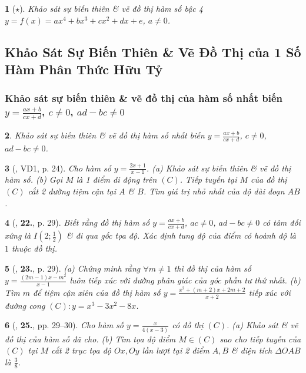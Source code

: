 \documentclass{article}
\newtheorem{baitoan}{}
\begin{document}
\begin{baitoan}[$\star$]
	Khảo sát sự biến thiên \& vẽ đồ thị hàm số bậc 4 $y = f(x) = ax^4 + bx^3 + cx^2 + dx + e$, $a\ne 0$.
\end{baitoan}


\subsection{Khảo Sát Sự Biến Thiên \& Vẽ Đồ Thị của 1 Số Hàm Phân Thức Hữu Tỷ}

\subsubsection{Khảo sát sự biến thiên \& vẽ đồ thị của hàm số nhất biến $y = \frac{ax + b}{cx + d}$, $c\ne 0$, $ad - bc\ne 0$}

\begin{baitoan}
	Khảo sát sự biến thiên \& vẽ đồ thị hàm số nhất biến $y = \frac{ax + b}{cx + d}$, $c\ne 0$, $ad - bc\ne 0$.
\end{baitoan}

\begin{baitoan}[\cite{TLCT_giai_tich_12}, VD1, p. 24]
	Cho hàm số $y = \frac{2x + 1}{x - 1}$. (a) Khảo sát sự biến thiên \& vẽ đồ thị hàm số. (b) Gọi $M$ là 1 điểm di động trên $(C)$. Tiếp tuyến tại $M$ của đồ thị $(C)$ cắt 2 đường tiệm cận tại $A$ \& $B$. Tìm giá trị nhỏ nhất của độ dài đoạn $AB$.
\end{baitoan}

\begin{baitoan}[\cite{TLCT_giai_tich_12}, \textbf{22.}, p. 29]
	Biết rằng đồ thị hàm số $y = \frac{ax + b}{cx + d}$, $ac\ne 0$, $ad - bc\ne 0$ có tâm đối xứng là $I\left(2;\frac{1}{2}\right)$ \& đi qua gốc tọa độ. Xác định tung độ của điểm có hoành độ là $1$ thuộc đồ thị.
\end{baitoan}

\begin{baitoan}[\cite{TLCT_giai_tich_12}, \textbf{23.}, p. 29]
	(a) Chứng minh rằng $\forall m\ne 1$ thì đồ thị của hàm số $y = \frac{(2m - 1)x - m^2}{x - 1}$ luôn tiếp xúc với đường phân giác của góc phần tư thứ nhất. (b) Tìm $m$ để tiệm cận xiên của đồ thị hàm số $y = \frac{x^2 + (m + 2)x + 2m + 2}{x + 2}$ tiếp xúc với đường cong $(C):y = x^3 - 3x^2 - 8x$.	
\end{baitoan}

\begin{baitoan}[\cite{TLCT_giai_tich_12}, \textbf{25.}, pp. 29--30]
	Cho hàm số $y = \frac{x}{4(x - 3)}$ có đồ thị $(C)$. (a) Khảo sát \& vẽ đồ thị của hàm số đã cho. (b) Tìm tọa độ điểm $M\in(C)$ sao cho tiếp tuyến của $(C)$ tại $M$ cắt 2 trục tọa độ $Ox,Oy$ lần lượt tại 2 điểm $A,B$ \& diện tích $\Delta OAB$ là $\frac{3}{8}$.	
\end{baitoan}
\end{document}

